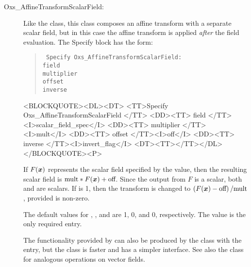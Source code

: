 \begin{description}
%
\item[Oxs\_AffineTransformScalarField:\label{item:AffineTransformScalarField}]
Like the  class, this class composes
an affine transform with a separate scalar field, but in this case the
affine transform is applied \textit{after} the field evaluation.
The Specify block has the form:
\begin{latexonly}
\begin{quote}\tt
Specify Oxs\_AffineTransformScalarField: \ocb\\
 \bi field \\
 \bi multiplier \\
 \bi offset \\
 \bi inverse \\
\ccb
\end{quote}
\end{latexonly}
\begin{rawhtml}
<BLOCKQUOTE><DL><DT>
<TT>Specify Oxs_AffineTransformScalarField {</TT>
<DD><TT> field </TT><I>scalar_field_spec</I>
<DD><TT> multiplier </TT><I>mult</I>
<DD><TT> offset </TT><I>off</I>
<DD><TT> inverse </TT><I>invert_flag</I>
<DT><TT>}</TT></DL></BLOCKQUOTE><P>
\end{rawhtml}
If $F(\mbox{\boldmath$x$})$ represents the scalar field specified by the
 value, then the resulting scalar field is
$\textrm{mult}*F(\mbox{\boldmath$x$})+\textrm{off}$.  Since the output
from $F$ is a scalar, both  and 
are scalars.  If  is 1, then the transform is changed
to $\left(F(\mbox{\boldmath$x$})-\textrm{off}\right)/\textrm{mult}$,
provided  is non-zero.

The default values for , , and
 are 1, 0, and 0, respectively.  The 
value is the only required entry.

The functionality provided by  can
also be produced by the
class with the
 entry, but the 
class is faster and has a simpler interface.  See also the
class for analogous
operations on vector fields.


\end{description}
